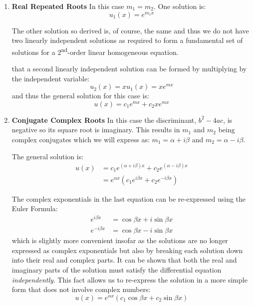 \begin{enumerate}
\item \textbf{Real Repeated Roots}
In this case $m_1 = m_2$.  One solution is:
\begin{equation}
u_1(x) = e^{m_1x}
\end{equation}

The other solution so derived is, of course, the same and thus we do not have two linearly independent solutions as required to form a fundamental set of solutions for a 2\textsuperscript{nd}-order linear homogeneous equation.  

 that a second linearly independent solution can be formed by multiplying by the independent variable:
\begin{equation*}
u_2(x) = x u_1(x) = xe^{mx}
\end{equation*}
and thus the general solution for this case is:
\begin{equation}
u(x) = c_1e^{mx}+c_2xe^{mx}
\label{eq:rep-real-roots}
\end{equation}

\item \textbf{Conjugate Complex Roots}
In this case the discriminant, $b^2-4ac$, is negative so its square root is imaginary.  This results in $m_1$ and $m_2$ being complex conjugates which we will express as: $m_1 = \alpha + i\beta$ and $m_2 = \alpha - i\beta$.

The general solution is:
\begin{align*}
u(x) &= c_1e^{(\alpha + i\beta)x}+c_2e^{(\alpha - i\beta)x} \\
&=e^{\alpha x}\left(c_1e^{i\beta x} + c_2e^{-i\beta x} \right) 
\end{align*}

The complex exponentials in the last equation can be re-expressed using the Euler Formula:
\begin{align*}
e^{i\beta x} &= \cos{\beta x} + i \sin{\beta x} \\
e^{-i\beta x} &= \cos{\beta x} - i \sin{\beta x}
\end{align*}
which is slightly more convenient insofar as the solutions are no longer expressed as complex exponentials but also by breaking each solution down into their real and complex parts. It can be shown that both the real and imaginary parts of the solution must satisfy the differential equation \emph{independently}.  This fact allows us to re-express the solution in a more simple form that does not involve complex numbers:
\begin{equation}
u(x) = e^{\alpha x}\left(c_1 \cos{\beta x} + c_2 \sin{\beta x} \right)
\label{eq:cmplx-conj-roots}
\end{equation}


\end{enumerate}
